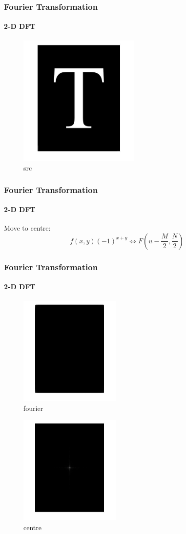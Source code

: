 \documentclass[11 pt,t]{beamer}
\begin{document}
\begin{frame}
\frametitle{Fourier Transformation}
\framesubtitle{2-D DFT}
\begin{figure}
   \includegraphics[width=6cm]{src.jpg}
\caption{src}
 \end{figure}
\end{frame}

\begin{frame}
\frametitle{Fourier Transformation}
\framesubtitle{2-D DFT}
Move to centre:\\
   $$f(x,y)(-1)^{x+y}\Longleftrightarrow F(u-\frac{M}{2},\frac{N}{2})$$

\end{frame}

\begin{frame}
\frametitle{Fourier Transformation}
\framesubtitle{2-D DFT}
\begin{minipage}[t]{0.4\linewidth}
\begin{figure}
   \includegraphics[width=5cm]{fourier}
\caption{fourier}
 \end{figure}
        \end{minipage}
\begin{minipage}[t]{0.4\linewidth}
\begin{figure}
   \includegraphics[width=5cm]{centre}
\caption{centre}
 \end{figure}
        \end{minipage}
\end{frame}
\end{document}
